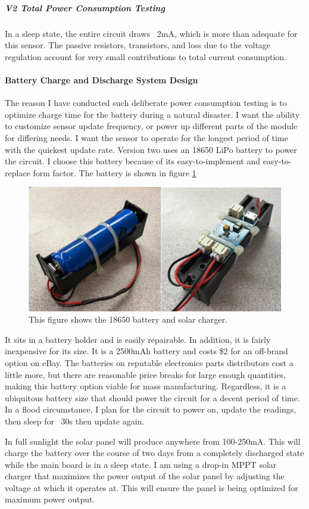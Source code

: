 \documentclass[letter]{article}
\begin{document}
\subparagraph{V2 Total Power Consumption Testing} In a sleep state, the entire circuit draws ~2mA, which is more than adequate for this sensor. The passive resistors, transistors, and loss due to the voltage regulation account for very small contributions to total current consumption. 

\paragraph{Battery Charge and Discharge System Design} The reason I have conducted such deliberate power consumption testing is to optimize charge time for the battery during a natural disaster. I want the ability to customize sensor update frequency, or power up different parts of the module for differing needs. I want the sensor to operate for the longest period of time with the quickest update rate. Version two uses an 18650 LiPo battery to power the circuit. I choose this battery because of its easy-to-implement and easy-to-replace form factor. The battery is shown in figure \ref{fig:batteryHolder}

\begin{figure}[ht]
	\centering
	\includegraphics[width=.7\textwidth]{img/batteryHolder.png}
	\caption{\label{fig:batteryHolder} This figure shows the 18650 battery and solar charger.}
\end{figure}

It sits in a battery holder and is easily repairable. In addition, it is fairly inexpensive for its size. It is a 2500mAh battery and costs \$2 for an off-brand option on eBay. The batteries on reputable electronics parts distributors cost a little more, but there are reasonable price breaks for large enough quantities, making this battery option viable for mass manufacturing. Regardless, it is a ubiquitous battery size that should power the circuit for a decent period of time. In a flood circumstance, I plan for the circuit to power on, update the readings, then sleep for ~30s then update again.

In full sunlight the solar panel will produce anywhere from 100-250mA. This will charge the battery over the course of two days from a completely discharged state while the main board is in a sleep state. I am using a drop-in MPPT solar charger that maximizes the power output of the solar panel by adjusting the voltage at which it operates at. This will ensure the panel is being optimized for maximum power output. 
\end{document}
